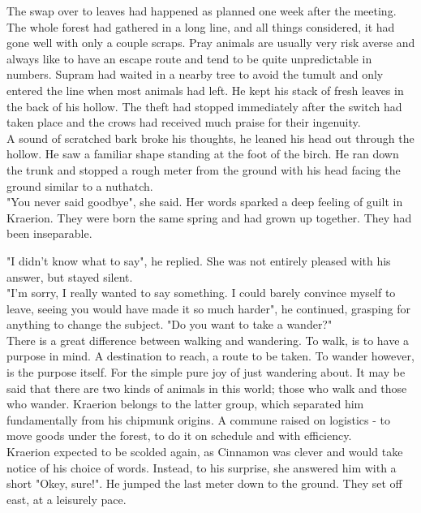 \documentclass[smalldemyvopaper,11pt,twoside,onecolumn,openright,extrafontsizes]{memoir}
\begin{document}
The swap over to leaves had happened as planned one week after the meeting. The whole forest had gathered in a long line, and all things considered, it had gone well with only a couple scraps. Pray animals are usually very risk averse and always like to have an escape route and tend to be quite unpredictable in numbers. Supram had waited in a nearby tree to avoid the tumult and only entered the line when most animals had left. He kept his stack of fresh leaves in the back of his hollow. The theft had stopped immediately after the switch had taken place and the crows had received much praise for their ingenuity.\\

A sound of scratched bark broke his thoughts, he leaned his head out through the hollow. He saw a familiar shape standing at the foot of the birch. He ran down the trunk and stopped a rough meter from the ground with his head facing the ground similar to a nuthatch.\\

"You never said goodbye", she said. Her words sparked a deep feeling of guilt in Kraerion. They were born the same spring and had grown up together. They had been inseparable. 

"I didn't know what to say", he replied. She was not entirely pleased with his answer, but stayed silent.\\

"I'm sorry, I really wanted to say something. I could barely convince myself to leave, seeing you would have made it so much harder", he continued, grasping for anything to change the subject. "Do you want to take a wander?" \\ 


There is a great difference between walking and wandering. To walk, is to have a purpose in mind. A destination to reach, a route to be taken. To wander however, is the purpose itself. For the simple pure joy of just wandering about. It may be said that there are two kinds of animals in this world; those who walk and those who wander. Kraerion belongs to the latter group, which separated him fundamentally from his chipmunk origins. A commune raised on logistics - to move goods under the forest, to do it on schedule and with efficiency. \\

Kraerion expected to be scolded again, as Cinnamon was clever and would take notice of his choice of words. Instead, to his surprise, she answered him with a short "Okey, sure!". He jumped the last meter down to the ground. They set off east, at a leisurely pace. \\
\end{document}
